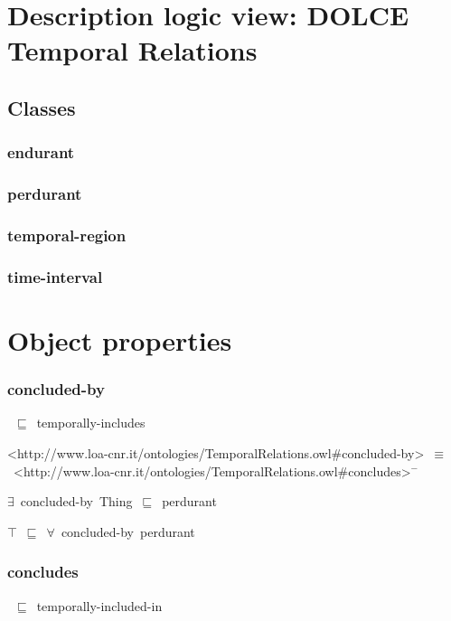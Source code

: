 \documentclass{article}
\begin{document}
\section*{Description logic view: DOLCE Temporal Relations}

\subsection*{Classes}

\subsubsection*{endurant}

\subsubsection*{perdurant}

\subsubsection*{temporal-region}

\subsubsection*{time-interval}

\section*{Object properties}\subsubsection*{concluded-by}

~\ensuremath{\sqsubseteq}~temporally-includes

<http://www.loa-cnr.it/ontologies/TemporalRelations.owl#concluded-by>~\ensuremath{\equiv}~<http://www.loa-cnr.it/ontologies/TemporalRelations.owl#concludes>\ensuremath{^-}

\ensuremath{\exists}~concluded-by~Thing~\ensuremath{\sqsubseteq}~perdurant

\ensuremath{\top}~\ensuremath{\sqsubseteq}~\ensuremath{\forall}~concluded-by~perdurant

\subsubsection*{concludes}

~\ensuremath{\sqsubseteq}~temporally-included-in
\end{document}
